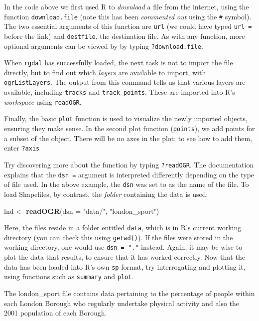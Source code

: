 \documentclass[]{article}
\newenvironment{Shaded}{}{}
\newcommand{\KeywordTok}[1]{\textcolor[rgb]{0.00,0.44,0.13}{\textbf{{#1}}}}
\newcommand{\DataTypeTok}[1]{\textcolor[rgb]{0.56,0.13,0.00}{{#1}}}
\newcommand{\StringTok}[1]{\textcolor[rgb]{0.25,0.44,0.63}{{#1}}}
\newcommand{\NormalTok}[1]{{#1}}
\begin{document}
In the code above we first used R to \emph{download} a file from the
internet, using the function \texttt{download.file} (note this has been
\emph{commented out} using the \texttt{\#} symbol). The two essential
arguments of this function are \texttt{url} (we could have typed
\texttt{url =} before the link) and \texttt{destfile}, the destination
file. As with any function, more optional arguments can be viewed by by
typing \texttt{?download.file}.

When \texttt{rgdal} has successfully loaded, the next task is not to
import the file directly, but to find out which \emph{layers} are
available to import, with \texttt{ogrListLayers}. The output from this
command tells us that various layers are available, including
\texttt{tracks} and \texttt{track\_points}. These are imported into R's
\emph{workspace} using \texttt{readOGR}.

Finally, the basic \texttt{plot} function is used to visualize the newly
imported objects, ensuring they make sense. In the second plot function
(\texttt{points}), we add points for a subset of the object. There will
be no axes in the plot; to see how to add them, enter \texttt{?axis}

Try discovering more about the function by typing \texttt{?readOGR}. The
documentation explains that the \texttt{dsn =} argument is interpreted
differently depending on the type of file used. In the above example,
the \texttt{dsn} was set to as the name of the file. To load Shapefiles,
by contrast, the \emph{folder} containing the data is used:

\begin{Shaded}
\begin{Highlighting}[]
\NormalTok{lnd <- }\KeywordTok{readOGR}\NormalTok{(}\DataTypeTok{dsn =} \StringTok{"data/"}\NormalTok{, }\StringTok{"london_sport"}\NormalTok{)}
\end{Highlighting}
\end{Shaded}
Here, the files reside in a folder entitled \texttt{data}, which is in
R's current working directory (you can check this using
\texttt{getwd()}). If the files were stored in the working directory,
one would use \texttt{dsn = "."} instead. Again, it may be wise to plot
the data that results, to ensure that it has worked correctly. Now that
the data has been loaded into R's own \texttt{sp} format, try
interrogating and plotting it, using functions such as \texttt{summary}
and \texttt{plot}.

The london\_sport file contains data pertaining to the percentage of
people within each London Borough who regularly undertake physical
activity and also the 2001 population of each Borough.
\end{document}
